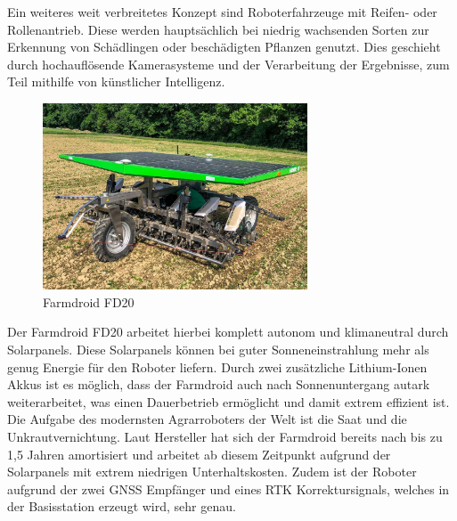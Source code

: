 Ein weiteres weit verbreitetes Konzept sind Roboterfahrzeuge mit Reifen- oder
Rollenantrieb. Diese werden hauptsächlich bei niedrig wachsenden Sorten zur
Erkennung von Schädlingen oder beschädigten Pflanzen genutzt. Dies geschieht
durch hochauflösende Kamerasysteme und der Verarbeitung der Ergebnisse, zum
Teil mithilfe von künstlicher Intelligenz.

\begin{figure}[h]
	\centering
	\includegraphics[width=0.7\textwidth]{bilder/farmdroid_fd20.png}
	\caption[Farmdroid FD20]{Farmdroid FD20}
	\label{fig:farmdroid_fd20}
\end{figure}

Der Farmdroid FD20 arbeitet hierbei komplett autonom und klimaneutral durch
Solarpanels. Diese Solarpanels können bei guter Sonneneinstrahlung mehr als
genug Energie für den Roboter liefern. Durch zwei zusätzliche Lithium-Ionen
Akkus ist es möglich, dass der Farmdroid auch nach Sonnenuntergang autark
weiterarbeitet, was einen Dauerbetrieb ermöglicht und damit extrem effizient
ist.\cite{jungwirth2022arbeitszeitbedarf}\\ Die Aufgabe des modernsten
Agrarroboters der Welt\cite{donaukurier2022} ist die Saat und die
Unkrautvernichtung. Laut Hersteller hat sich der Farmdroid bereits nach bis zu
1,5 Jahren amortisiert und arbeitet ab diesem Zeitpunkt aufgrund der
Solarpanels mit extrem niedrigen Unterhaltskosten. Zudem ist der Roboter
aufgrund der zwei GNSS Empfänger und eines RTK Korrektursignals, welches in der
Basisstation erzeugt wird, sehr genau.\cite{jungwirth2022arbeitszeitbedarf}